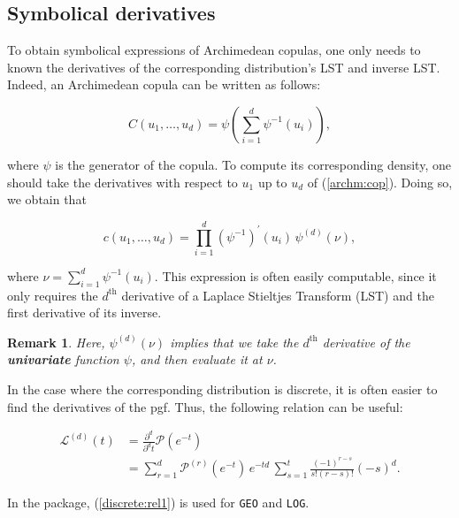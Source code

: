 \documentclass[11pt, english]{article}\usepackage[]{graphicx}\usepackage[]{color}
\newtheorem{rem}{Remark}
\begin{document}
\subsection{Symbolical derivatives}

To obtain symbolical expressions of Archimedean copulas, one only needs to known the derivatives of the corresponding distribution's LST and inverse LST. Indeed, an Archimedean copula can be written as follows:

\begin{equation}\label{archm:cop}
  C(u_1, \ldots, u_d) = \psi \left( \sum_{i = 1}^d \psi^{-1}(u_i) \right),
\end{equation}

where $\psi$ is the generator of the copula. To compute its corresponding density, one should take the  derivatives with respect to $u_1$ up to $u_d$ of (\ref{archm:cop}). Doing so, we obtain that

\begin{equation}
  c(u_1, \ldots, u_d) = \prod_{i = 1}^d \left(\psi^{-1}\right)^\prime (u_i) \, \psi^{(d)}(\nu),
\end{equation}

where $\nu = \sum_{i = 1}^d \psi^{-1}(u_i)$. This expression is often easily computable, since it only requires the $d^{\text{th}}$ derivative of a Laplace Stieltjes Transform (LST) and the first derivative of its inverse.

\begin{rem} Here, $\psi^{(d)}(\nu)$ implies that we take the $d^\text{th}$ derivative of the \textbf{univariate} function $\psi$, and then evaluate it at $\nu$.
\end{rem}

In the case where the corresponding distribution is discrete, it is often easier to find the derivatives of the pgf. Thus, the following relation can be useful:

\begin{align}\label{discrete:rel1}
  \mathcal{L}^{(d)}(t) &= \frac{\partial^d}{\partial^d t} \mathcal{P} \left(e^{-t}\right) \nonumber \\
  &= \sum_{r = 1}^d \mathcal{P}^{(r)}\left(e^{-t}\right) \, e^{-td} \, \sum_{s = 1}^t \frac{(-1)^{r - s}}{s! (r - s)!} (-s)^d.
\end{align}

In the package, (\ref{discrete:rel1}) is used for \texttt{GEO} and \texttt{LOG}. 

\newpage

\appendix
\end{document}
